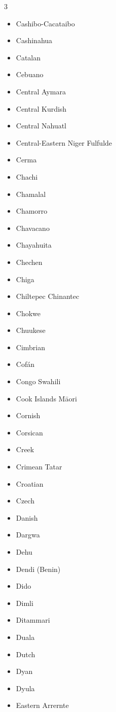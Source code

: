 \documentclass[paper=a4, 10pt]{scrbook}
\begin{document}
\begin{multicols}{3}
\begin{itemize}
        \item Cashibo-Cacataibo
        \item Cashinahua
        \item Catalan
        \item Cebuano
        \item Central Aymara
        \item Central Kurdish
        \item Central Nahuatl
        \item Central-Eastern Niger Fulfulde
        \item Cerma
        \item Chachi
        \item Chamalal
        \item Chamorro
        \item Chavacano
        \item Chayahuita
        \item Chechen
        \item Chiga
        \item Chiltepec Chinantec
        \item Chokwe
        \item Chuukese
        \item Cimbrian
        \item Cofán
        \item Congo Swahili
        \item Cook Islands Māori
        \item Cornish
        \item Corsican
        \item Creek
        \item Crimean Tatar
        \item Croatian
        \item Czech
        \item Danish
        \item Dargwa
        \item Dehu
        \item Dendi (Benin)
        \item Dido
        \item Dimli
        \item Ditammari
        \item Duala
        \item Dutch
        \item Dyan
        \item Dyula
        \item Eastern Arrernte

\end{itemize}
\end{multicols}
\end{document}
